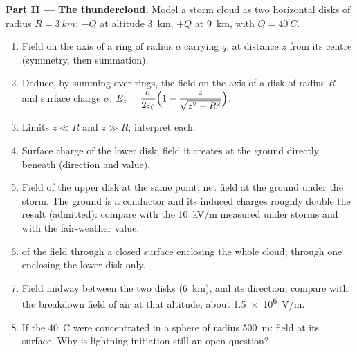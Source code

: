 \begin{problem}
\medskip
\noindent\textbf{Part II --- The thundercloud.}
Model a storm cloud as two horizontal disks of radius $R = \qty{3}{km}$:
$-Q$ at altitude \qty{3}{km}, $+Q$ at \qty{9}{km}, with $Q = \qty{40}{C}$.
\begin{enumerate}[resume]
  \item Field on the axis of a ring of radius $a$ carrying $q$, at
        distance $z$ from its centre (symmetry, then summation).
  \item Deduce, by summing over rings, the field on the axis of a disk
        of radius $R$ and surface charge $\sigma$:
        $E_z = \dfrac{\sigma}{2\varepsilon_0}\Bigl(1 - \dfrac{z}{\sqrt{z^2 + R^2}}\Bigr)$.
  \item Limits $z \ll R$ and $z \gg R$; interpret each.
  \item Surface charge of the lower disk; field it creates at the ground
        directly beneath (direction and value).
  \item Field of the upper disk at the same point; net field at the
        ground under the storm. The ground is a conductor and its induced
        charges roughly double the result (admitted): compare with the
        \qty{10}{kV/m} measured under storms and with the fair-weather
        value.
  \item {} of the field through a closed surface enclosing the whole
        cloud; through one enclosing the lower disk only.
  \item Field midway between the two disks (\qty{6}{km}), and its
        direction; compare with the breakdown field of air at that
        altitude, about \qty{1.5e6}{V/m}.
  \item If the \qty{40}{C} were concentrated in a sphere of radius
        \qty{500}{m}: field at its surface. Why is lightning initiation
        still an open question?
\end{enumerate}


\end{problem}
